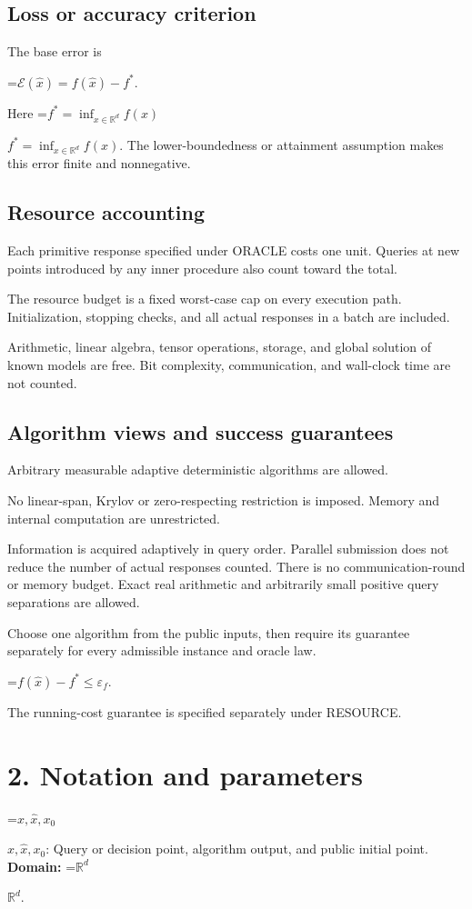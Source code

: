 \documentclass[10pt,a4paper]{article}
\newcommand{\AtlasMath}[1]{\par\begingroup\centering\setbox0=\hbox{$\displaystyle #1$}\ifdim\wd0>1.4\linewidth\typeout{ATLAS WIDE FORMULA: \the\wd0}\fi\ifdim\wd0>\linewidth\resizebox{\linewidth}{!}{\box0}\else\box0\fi\par\endgroup}
\newcommand{\AtlasInlineMath}[1]{\begingroup\setbox0=\hbox{$#1$}\ifdim\wd0>.4\linewidth\endgroup\AtlasMath{#1}\else\endgroup$#1$\fi}
\begin{document}
\subsection{Loss or accuracy criterion}
The base error is


\AtlasMath{\mathcal{E}(\widehat{x})=f(\widehat{x})-f^*.}


Here \AtlasInlineMath{f^*=\inf_{x\in \mathbb{R}^d}f(x)}. The lower-boundedness or attainment assumption makes this error finite and nonnegative.

\subsection{Resource accounting}
Each primitive response specified under ORACLE costs one unit. Queries at new points introduced by any inner procedure also count toward the total.

The resource budget is a fixed worst-case cap on every execution path. Initialization, stopping checks, and all actual responses in a batch are included.

Arithmetic, linear algebra, tensor operations, storage, and global solution of known models are free. Bit complexity, communication, and wall-clock time are not counted.

\subsection{Algorithm views and success guarantees}
Arbitrary measurable adaptive deterministic algorithms are allowed.

No linear-span, Krylov or zero-respecting restriction is imposed. Memory and internal computation are unrestricted.

Information is acquired adaptively in query order. Parallel submission does not reduce the number of actual responses counted. There is no communication-round or memory budget. Exact real arithmetic and arbitrarily small positive query separations are allowed.

Choose one algorithm from the public inputs, then require its guarantee separately for every admissible instance and oracle law.


\AtlasMath{f(\widehat{x})-f^*\le \varepsilon_f.}


The running-cost guarantee is specified separately under RESOURCE.

\section{2. Notation and parameters}
\AtlasInlineMath{x,\widehat{x},x_0}: Query or decision point, algorithm output, and public initial point. \textbf{Domain:} \AtlasInlineMath{\mathbb{R}^d}.
\end{document}

